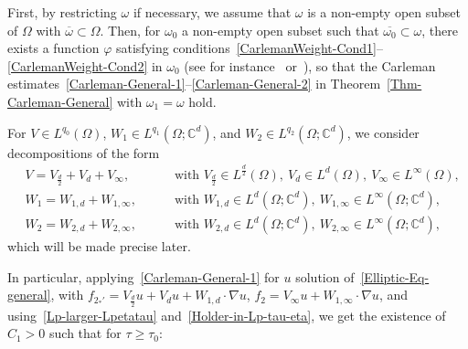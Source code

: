 \documentclass[10pt]{amsart}
\theoremstyle{definition}\newtheorem{defi}[theo]{Definition}\newtheorem{rema}[theo]{Remark}\newtheorem{exam}[theo]{Example}\newtheorem{exem}[theo]{Example}\newtheorem{nota}[theo]{Notation}
\newcommand*\C{\mathbb{C}}
\renewcommand{\geq}{\geqslant}
\begin{document}
First, by restricting $\omega$ if necessary, we assume that $\omega$ is a non-empty open subset of $\Omega$ with $\overline\omega \subset \Omega$. Then, for $\omega_0$ a non-empty open subset such that $\overline{\omega_0} \subset \omega$, there exists a function $\varphi$ satisfying conditions~\eqref{CarlemanWeight-Cond1}--\eqref{CarlemanWeight-Cond2} in $\omega_0$ (see for instance~\cite[Lemma~1.1]{Fursikov1996-book} or~\cite[Proposition~3.31]{LeRousseaubookvolume1}), so that the Carleman estimates~\eqref{Carleman-General-1}--\eqref{Carleman-General-2} in Theorem~\ref{Thm-Carleman-General} with $\omega_1 = \omega$ hold.

For $V \in L^{q_0}(\Omega)$, $W_1 \in L^{q_1}(\Omega; \C^d)$, and $W_2 \in L^{q_2}(\Omega; \C^d)$, we consider decompositions of the form
\begin{align*}
& V = V_{\frac{d}{2}} + V_{d}+ V_\infty,
\quad &&\text{ with } V_{\frac{d}{2}} \in L^{\frac{d}{2}}(\Omega),
\ V_{d} \in L^{d}(\Omega),
\ V_{\infty} \in L^{\infty}(\Omega),
\\
& W_1 = W_{1,d} + W_{1,\infty},
\quad &&\text{ with } W_{1,d} \in L^{d}\left(\Omega; \C^d\right),
\ W_{1,\infty} \in L^{\infty}\left(\Omega; \C^d\right),
\\
& W_2 = W_{2,d} + W_{2,\infty},
\quad &&\text{ with } W_{2,d} \in L^{d}\left(\Omega; \C^d\right),
\ W_{2,\infty} \in L^{\infty}\left(\Omega; \C^d\right),
\end{align*}
which will be made precise later.

In particular, applying~\eqref{Carleman-General-1} for $u$ solution of~\eqref{Elliptic-Eq-general}, with $f_{2_*'} = V_{\frac{d}{2}} u + V_{d} u+ W_{1,d} \cdot \nabla u$, $f_2 = V_{\infty} u+ W_{1,\infty} \cdot \nabla u$, and using~\eqref{Lp-larger-Lpetatau} and~\eqref{Holder-in-Lp-tau-eta}, we get the existence of $C_1>0$ such that for $\tau \geq \tau_0$:
\end{document}
